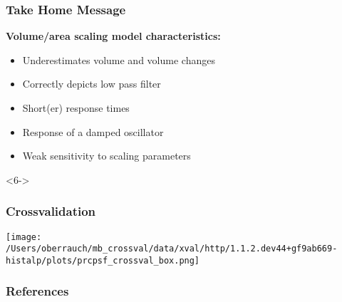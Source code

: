 \documentclass[12pt, aspectratio=169, abstract=off, oneside]{beamer}
\begin{document}
    \begin{frame}[t]\frametitle{Take Home Message}
        \vfill
        \textbf{Volume/area scaling model characteristics:}
        \begin{itemize}
            \item<1->Underestimates volume and volume changes
            \item<2->Correctly depicts low pass filter
            \item<3->Short(er) response times
            \item<4->Response of a damped oscillator
            \item<5->Weak sensitivity to scaling parameters
        \end{itemize}

        \begin{block}{\color[HTML]{f69d0e}{(Maybe) not up to date, anymore.}}<6->
        
        \end{block}
        
    
    
    \end{frame}

    \begin{frame}[t]\frametitle{Crossvalidation}
        \centering
        \texttt{[image: /Users/oberrauch/mb\_crossval/data/xval/http/1.1.2.dev44+gf9ab669-histalp/plots/prcpsf\_crossval\_box.png]}
        
    
    \end{frame}

    \begin{frame}[t]\frametitle{References}
        
        
    \end{frame}
	
\end{document}
